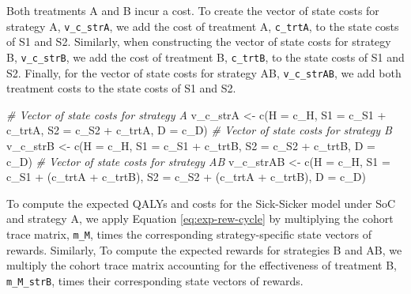 \documentclass[
]{article}
\newenvironment{Shaded}{\begin{snugshade}}{\end{snugshade}}
\newcommand{\AttributeTok}[1]{\textcolor[rgb]{0.77,0.63,0.00}{#1}}
\newcommand{\CommentTok}[1]{\textcolor[rgb]{0.56,0.35,0.01}{\textit{#1}}}
\newcommand{\FunctionTok}[1]{\textcolor[rgb]{0.00,0.00,0.00}{#1}}
\newcommand{\NormalTok}[1]{#1}
\newcommand{\OtherTok}[1]{\textcolor[rgb]{0.56,0.35,0.01}{#1}}
\newcommand{\SpecialCharTok}[1]{\textcolor[rgb]{0.00,0.00,0.00}{#1}}
\begin{document}
Both treatments A and B incur a cost. To create the vector of state costs for strategy A, \texttt{v\_c\_strA}, we add the cost of treatment A, \texttt{c\_trtA}, to the state costs of S1 and S2. Similarly, when constructing the vector of state costs for strategy B, \texttt{v\_c\_strB}, we add the cost of treatment B, \texttt{c\_trtB}, to the state costs of S1 and S2. Finally, for the vector of state costs for strategy AB, \texttt{v\_c\_strAB}, we add both treatment costs to the state costs of S1 and S2.

\begin{Shaded}
\begin{Highlighting}[]
\CommentTok{\# Vector of state costs for strategy A}
\NormalTok{v\_c\_strA }\OtherTok{\textless{}{-}} \FunctionTok{c}\NormalTok{(}\AttributeTok{H  =}\NormalTok{ c\_H, }
              \AttributeTok{S1 =}\NormalTok{ c\_S1 }\SpecialCharTok{+}\NormalTok{ c\_trtA, }
              \AttributeTok{S2 =}\NormalTok{ c\_S2 }\SpecialCharTok{+}\NormalTok{ c\_trtA, }
              \AttributeTok{D  =}\NormalTok{ c\_D)}
\CommentTok{\# Vector of state costs for strategy B}
\NormalTok{v\_c\_strB }\OtherTok{\textless{}{-}} \FunctionTok{c}\NormalTok{(}\AttributeTok{H  =}\NormalTok{ c\_H, }
              \AttributeTok{S1 =}\NormalTok{ c\_S1 }\SpecialCharTok{+}\NormalTok{ c\_trtB, }
              \AttributeTok{S2 =}\NormalTok{ c\_S2 }\SpecialCharTok{+}\NormalTok{ c\_trtB, }
              \AttributeTok{D  =}\NormalTok{ c\_D)}
\CommentTok{\# Vector of state costs for strategy AB}
\NormalTok{v\_c\_strAB }\OtherTok{\textless{}{-}} \FunctionTok{c}\NormalTok{(}\AttributeTok{H  =}\NormalTok{ c\_H, }
               \AttributeTok{S1 =}\NormalTok{ c\_S1 }\SpecialCharTok{+}\NormalTok{ (c\_trtA }\SpecialCharTok{+}\NormalTok{ c\_trtB), }
               \AttributeTok{S2 =}\NormalTok{ c\_S2 }\SpecialCharTok{+}\NormalTok{ (c\_trtA }\SpecialCharTok{+}\NormalTok{ c\_trtB), }
               \AttributeTok{D  =}\NormalTok{ c\_D)}
\end{Highlighting}
\end{Shaded}

To compute the expected QALYs and costs for the Sick-Sicker model under SoC and strategy A, we apply Equation \eqref{eq:exp-rew-cycle} by multiplying the cohort trace matrix, \texttt{m\_M}, times the corresponding strategy-specific state vectors of rewards. Similarly, To compute the expected rewards for strategies B and AB, we multiply the cohort trace matrix accounting for the effectiveness of treatment B, \texttt{m\_M\_strB}, times their corresponding state vectors of rewards.
\end{document}
